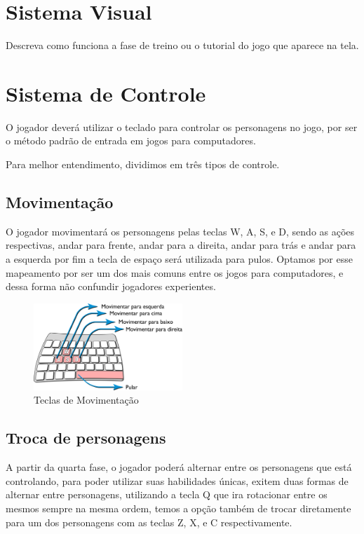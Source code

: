
\section{Sistema Visual}

Descreva como funciona a fase de treino ou o tutorial do jogo que aparece na tela.


\section{Sistema de Controle}

O jogador deverá utilizar o teclado para controlar os personagens no jogo, por ser o método padrão de entrada em jogos para computadores. 

Para melhor entendimento, dividimos em três tipos de controle.

\subsection{Movimentação}

O jogador movimentará os personagens pelas teclas W, A, S, e D, sendo as ações respectivas, andar para frente, andar para a direita, andar para trás e andar para a esquerda por fim a tecla de espaço será utilizada para pulos. Optamos por esse mapeamento por ser um dos mais comuns entre os jogos para computadores, e dessa forma não confundir jogadores experientes.

\begin{figure}[!htb] \caption{\label{fig_tacladoMov}Teclas de Movimentação} \begin{center}
\includegraphics[width=0.5\textwidth]{imagens/tecladoMov.png} \end{center}
 \end{figure}


\subsection{Troca de personagens}

A partir da quarta fase, o jogador poderá alternar entre os personagens que está controlando, para poder utilizar suas habilidades únicas, exitem duas formas de alternar entre personagens, utilizando a tecla Q que ira rotacionar entre os mesmos sempre na mesma ordem, temos a opção também de trocar diretamente para um dos personagens com as teclas Z, X, e C respectivamente.


